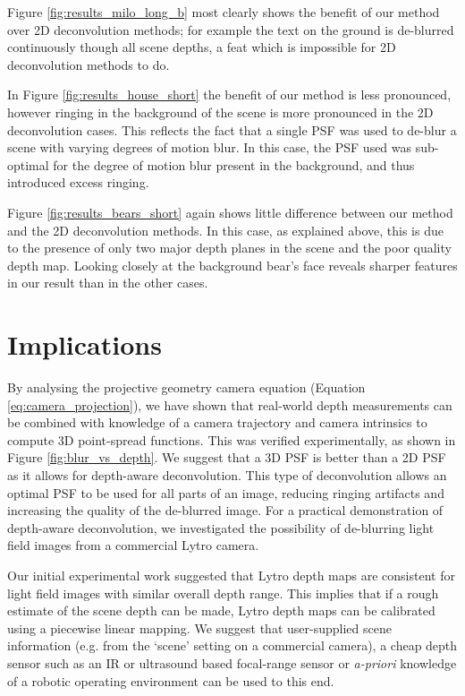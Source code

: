 Figure \ref{fig:results_milo_long_b} most clearly shows the benefit of our method over 2D deconvolution methods; for example the text on the ground is de-blurred continuously though all scene depths, a feat which is impossible for 2D deconvolution methods to do.

In Figure \ref{fig:results_house_short} the benefit of our method is less pronounced, however ringing in the background of the scene is more pronounced in the 2D deconvolution cases.
This reflects the fact that a single PSF was used to de-blur a scene with varying degrees of motion blur.
In this case, the PSF used was sub-optimal for the degree of motion blur present in the background, and thus introduced excess ringing.

Figure \ref{fig:results_bears_short} again shows little difference between our method and the 2D deconvolution methods.
In this case, as explained above, this is due to the presence of only two major depth planes in the scene and the poor quality depth map.
Looking closely at the background bear's face reveals sharper features in our result than in the other cases.

\section{Implications}
\label{sec:implications}

By analysing the projective geometry camera equation (Equation \ref{eq:camera_projection}), we have shown that real-world depth measurements can be combined with knowledge of a camera trajectory and camera intrinsics to compute 3D point-spread functions.
This was verified experimentally, as shown in Figure \ref{fig:blur_vs_depth}.
We suggest that a 3D PSF is better than a 2D PSF as it allows for depth-aware deconvolution.
This type of deconvolution allows an optimal PSF to be used for all parts of an image, reducing ringing artifacts and increasing the quality of the de-blurred image.
For a practical demonstration of depth-aware deconvolution, we investigated the possibility of de-blurring light field images from a commercial Lytro camera.

Our initial experimental work suggested that Lytro depth maps are consistent for light field images with similar overall depth range.
This implies that if a rough estimate of the scene depth can be made, Lytro depth maps can be calibrated using a piecewise linear mapping.
We suggest that user-supplied scene information (e.g. from the \enquote*{scene} setting on a commercial camera), a cheap depth sensor such as an IR or ultrasound based focal-range sensor or \emph{a-priori} knowledge of a robotic operating environment can be used to this end.

